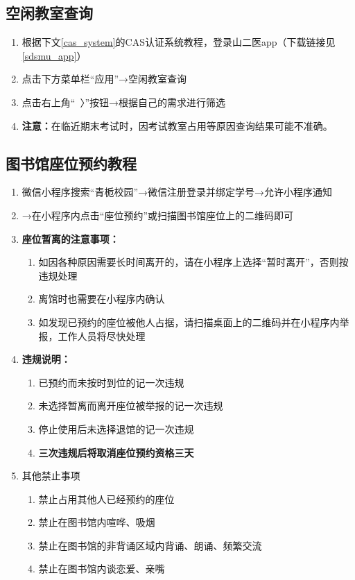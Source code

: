 \subsection[空闲教室查询]{空闲教室查询}
\label{spare_classroom}
\begin{enumerate}
    \item 根据下文\uline{\ref{cas_system}}的CAS认证系统教程，登录山二医app（下载链接见\uline{\ref{sdsmu_app}}）
    \item 点击下方菜单栏“应用”→空闲教室查询
    \item 点击右上角“\ 〉”按钮→根据自己的需求进行筛选
    \item \textbf{注意：}在临近期末考试时，因考试教室占用等原因查询结果可能不准确。
\end{enumerate}

\subsection[图书馆座位预约教程]{图书馆座位预约教程}
\label{library_book}
\begin{enumerate}
    \item 微信小程序搜索“青栀校园”→微信注册登录并绑定学号→允许小程序通知
    \item →在小程序内点击“座位预约”或扫描图书馆座位上的二维码即可
    \item \textbf{座位暂离的注意事项：}
          \begin{enumerate}
              \item 如因各种原因需要长时间离开的，请在小程序上选择“暂时离开”，否则按违规处理
              \item 离馆时也需要在小程序内确认
              \item 如发现已预约的座位被他人占据，请扫描桌面上的二维码并在小程序内举报，工作人员将尽快处理
          \end{enumerate}
    \item \textbf{违规说明：}
          \begin{enumerate}
              \item 已预约而未按时到位的记一次违规
              \item 未选择暂离而离开座位被举报的记一次违规
              \item 停止使用后未选择退馆的记一次违规
              \item \textbf{三次违规后将取消座位预约资格三天}
          \end{enumerate}
    \item 其他禁止事项
          \begin{enumerate}
              \item 禁止占用其他人已经预约的座位
              \item 禁止在图书馆内喧哗、吸烟
              \item 禁止在图书馆的非背诵区域内背诵、朗诵、频繁交流
              \item 禁止在图书馆内谈恋爱、亲嘴
          \end{enumerate}
\end{enumerate}

